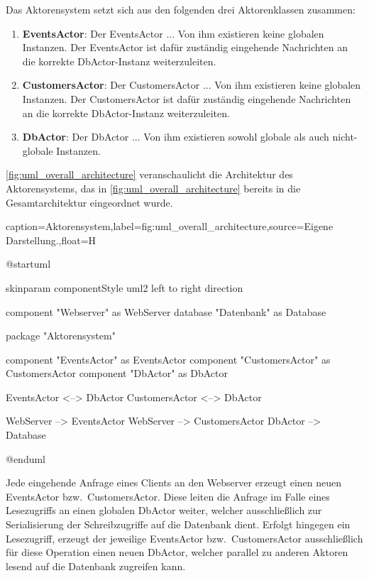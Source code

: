 Das Aktorensystem setzt sich aus den folgenden drei Aktorenklassen zusammen:
\begin{enumerate}
    \item \textbf{EventsActor}: Der EventsActor ... Von ihm existieren keine globalen Instanzen. Der EventsActor ist dafür zuständig eingehende Nachrichten an die korrekte DbActor-Instanz weiterzuleiten.
    \item \textbf{CustomersActor}: Der CustomersActor ... Von ihm existieren keine globalen Instanzen. Der CustomersActor ist dafür zuständig eingehende Nachrichten an die korrekte DbActor-Instanz weiterzuleiten.
    \item \textbf{DbActor}: Der DbActor ... Von ihm existieren sowohl globale als auch nicht-globale Instanzen.
\end{enumerate}

\autoref{fig:uml_overall_architecture} veranschaulicht die Architektur des Aktorensystems, das in \autoref{fig:uml_overall_architecture} bereits in die Gesamtarchitektur eingeordnet wurde.

\begin{dhbwfigure}{caption=Aktorensystem,label=fig:uml_overall_architecture,source={Eigene Darstellung.},float=H}
    \begin{plantuml}
        @startuml

            skinparam componentStyle uml2
            left to right direction

            component "Webserver" as WebServer
            database "Datenbank" as Database

            package "Aktorensystem" {
                component "EventsActor" as EventsActor
                component "CustomersActor" as CustomersActor
                component "DbActor" as DbActor

                EventsActor <--> DbActor
                CustomersActor <--> DbActor
            }

            WebServer --> EventsActor
            WebServer --> CustomersActor
            DbActor --> Database

        @enduml
    \end{plantuml}
\end{dhbwfigure}\unskip

Jede eingehende Anfrage eines Clients an den Webserver erzeugt einen neuen EventsActor bzw.\ CustomersActor.
Diese leiten die Anfrage im Falle eines Lesezugriffs an einen globalen DbActor weiter, welcher ausschließlich zur Serialisierung der Schreibzugriffe auf die Datenbank dient.
Erfolgt hingegen ein Lesezugriff, erzeugt der jeweilige EventsActor bzw.\ CustomersActor ausschließlich für diese Operation einen neuen DbActor, welcher parallel zu anderen Aktoren lesend auf die Datenbank zugreifen kann.

